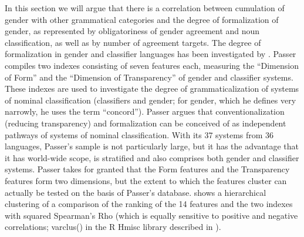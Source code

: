\documentclass[output=collectionpaper]{langsci/langscibook}
\begin{document}
In this section we will argue that there is a correlation between cumulation of gender with other grammatical categories and the degree of formalization of gender, as represented by obligatoriness of gender agreement and noun classification, as well as by number of agreement targets. The degree of formalization in gender and classifier languages has been investigated by \cite{Passer2016b}. Passer compiles two indexes consisting of seven features each, measuring the ``Dimension of Form'' and the ``Dimension of Transparency'' of gender and classifier systems. These indexes are used to investigate the degree of grammaticalization of systems of nominal classification (classifiers and gender; for gender, which he defines very narrowly, he uses the term ``concord''). Passer argues that conventionalization (reducing transparency) and formalization can be conceived of as independent pathways of systems of nominal classification. With its 37 systems from 36 languages, Passer's sample is not particularly large, but it has the advantage that it has world-wide scope, is stratified and also comprises both gender and classifier systems. Passer takes for granted that the Form features and the Transparency features form two dimensions, but the extent to which the features cluster can actually be tested on the basis of Passer's database.  shows a hierarchical clustering of a comparison of the ranking of the 14 features and the two indexes with squared Spearman's Rho (which is equally sensitive to positive and negative correlations; varclus() in the R Hmisc library described in \citealt{Harrell2001}).
\end{document}
